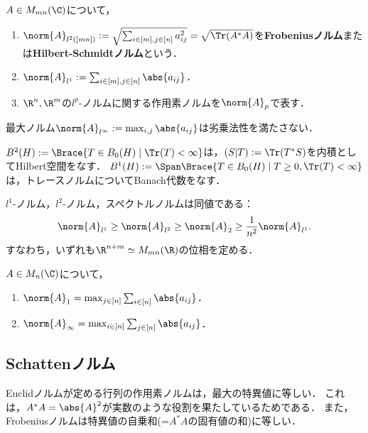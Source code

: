 \documentclass[uplatex, dvipdfmx]{jsreport}
\begin{document}
\begin{definition}
    $A\in M_{mn}(\C)$について，
    \begin{enumerate}
        \item $\norm{A}_{l^2([mn])}:=\sqrt{\sum_{i\in[m],j\in[n]}a_{ij}^2}=\sqrt{\Tr(A^*A)}$を\textbf{Frobeniusノルム}または\textbf{Hilbert-Schmidtノルム}という．
        \item $\norm{A}_{l^1}:=\sum_{i\in[m],j\in[n]}\abs{a_{ij}}$．
        \item $\R^n,\R^m$の$l^p$-ノルムに関する作用素ノルムを$\norm{A}_p$で表す．
    \end{enumerate}
\end{definition}
\begin{remark}
    最大ノルム$\norm{A}_{l^\infty}:=\max_{i,j}\abs{a_{ij}}$は劣乗法性を満たさない．
\end{remark}
\begin{remarks}
    $B^2(H):=\Brace{T\in B_0(H)\mid\Tr(T)<\infty}$は，$(S|T):=\Tr(T^*S)$を内積としてHilbert空間をなす．
    $B^1(H):=\Span\Brace{T\in B_0(H)\mid T\ge0,\Tr(T)<\infty}$は，トレースノルムについてBanach代数をなす．
\end{remarks}

\begin{proposition}[ノルムの同値性]
    $l^1$-ノルム，$l^2$-ノルム，スペクトルノルムは同値である：
    \[\norm{A}_{l^1}\ge\norm{A}_{l^2}\ge\norm{A}_2\ge\frac{1}{n^2}\norm{A}_{l^1}.\]
    すなわち，いずれも$\R^{n+m}\simeq M_{mn}(\R)$の位相を定める．
\end{proposition}

\begin{proposition}[作用素ノルムの表示]
    $A\in M_n(\C)$について，
    \begin{enumerate}
        \item $\norm{A}_1=\max_{j\in[n]}\sum_{i\in[n]}\abs{a_{ij}}$．
        \item $\norm{A}_\infty=\max_{i\in[n]}\sum_{j\in[n]}\abs{a_{ij}}$．
    \end{enumerate}
\end{proposition}

\subsection{Schattenノルム}

\begin{tcolorbox}[colframe=ForestGreen, colback=ForestGreen!10!white,breakable,colbacktitle=ForestGreen!40!white,coltitle=black,fonttitle=\bfseries\sffamily,
title=]
    Euclidノルムが定める行列の作用素ノルムは，最大の特異値に等しい．
    これは，$A^*A=\abs{A}^2$が実数のような役割を果たしているためである．
    また，Frobeniusノルムは特異値の自乗和(=$A^*A$の固有値の和)に等しい．
\end{tcolorbox}
\end{document}
